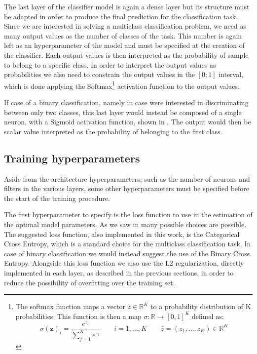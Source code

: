 The last layer of the classifier model is again a dense layer but its structure must be adapted in order to produce the final prediction for the classification task. 
Since we are interested in solving a multiclass classification problem, we need as many output values as the number of classes of the task. This number is again left as an hyperparameter of the model and must be specified at the creation of the classifier. Each output values is then interpreted as the probability of sample to belong to a specific class. In order to interpret the output values as probabilities we also need to constrain the output values in the $[0;1]$ interval, which is done applying the Softmax\footnote{The softmax function maps a vector $\bar{z}\in \mathbb{R}^K$ to a probability distribution of K probabilities. This function is then a map $\sigma:\mathbb{R}\to[0,1]^K$ defined as:
\begin{equation}
\sigma(\mathbf{z})_{i}=\frac{e^{z_{i}}}{\sum_{j=1}^{K} e^{z_{j}}} \quad \quad i=1, \ldots, K \qquad\bar{z}=\left(z_{1}, \ldots, z_{K}\right) \in \mathbb{R}^{K}
\end{equation}} activation function to the output values.

If case of a binary classification, namely in case were interested in discriminating between only two classes, this last layer would instead be composed of a single neuron, with a Sigmoid activation function, shown in . The output would then be scalar value interpreted as the probability of belonging to the first class.

\subsection{Training hyperparameters}

Aside from the architecture hyperparameters, such as the number of neurons and filters in the various layers, some other hyperparameters must be specified before the start of the training procedure. 

The first hyperparameter to specify is the loss function to use in the estimation of the optimal model parameters. As we saw in  many possible choices are possible. 
The suggested loss function, also implemented in this work, is the Categorical Cross Entropy,
which is a standard choice for the multiclass classification task. In case of binary classification we would instead suggest the use of the Binary Cross Entropy. Alongside this loss function we also use the L2 regularization, directly implemented in each layer, as described in the previous sections, in order to reduce the possibility of overfitting over the training set.

